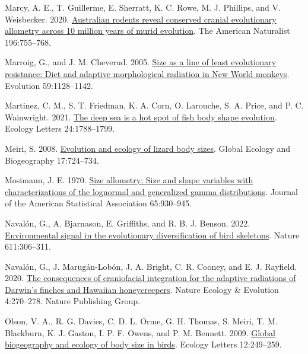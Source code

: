 \documentclass[
  11pt,
]{article}
\newlength{\cslhangindent}
\newlength{\cslentryspacingunit} %
\newenvironment{CSLReferences}[2] %
 {%
  \setlength{\parindent}{0pt}
  \ifodd #1
  \let\oldpar\par
  \def\par{\hangindent=\cslhangindent\oldpar}
  \fi
  \setlength{\parskip}{#2\cslentryspacingunit}
 }%
 {}
\begin{document}
\begin{CSLReferences}{1}{0}
\leavevmode{}%
Marcy, A. E., T. Guillerme, E. Sherratt, K. C. Rowe, M. J. Phillips, and
V. Weisbecker. 2020. \href{https://doi.org/10.1086/711398}{Australian
rodents reveal conserved cranial evolutionary allometry across 10
million years of murid evolution}. The American Naturalist 196:755--768.

\leavevmode{}%
Marroig, G., and J. M. Cheverud. 2005.
\href{https://doi.org/10.1111/j.0014-3820.2005.tb01049.x}{Size as a line
of least evolutionary resistance: Diet and adaptive morphological
radiation in {N}ew {W}orld monkeys}. Evolution 59:1128--1142.

\leavevmode{}%
Martinez, C. M., S. T. Friedman, K. A. Corn, O. Larouche, S. A. Price,
and P. C. Wainwright. 2021. \href{https://doi.org/10.1111/ele.13785}{The
deep sea is a hot spot of fish body shape evolution}. Ecology Letters
24:1788--1799.

\leavevmode{}%
Meiri, S. 2008.
\href{https://doi.org/10.1111/j.1466-8238.2008.00414.x}{Evolution and
ecology of lizard body sizes}. Global Ecology and Biogeography
17:724--734.

\leavevmode{}%
Mosimann, J. E. 1970.
\href{https://doi.org/10.1080/01621459.1970.10481136}{Size allometry:
Size and shape variables with characterizations of the lognormal and
generalized gamma distributions}. Journal of the American Statistical
Association 65:930--945.

\leavevmode{}%
Navalón, G., A. Bjarnason, E. Griffiths, and R. B. J. Benson. 2022.
\href{https://doi.org/10.1038/s41586-022-05372-y}{{Environmental signal
in the evolutionary diversification of bird skeletons}}. Nature
611:306--311.

\leavevmode{}%
Navalón, G., J. Marugán-Lobón, J. A. Bright, C. R. Cooney, and E. J.
Rayfield. 2020. \href{https://doi.org/10.1038/s41559-019-1092-y}{The
consequences of craniofacial integration for the adaptive radiations of
{D}arwin's finches and {H}awaiian honeycreepers}. Nature Ecology \&
Evolution 4:270--278. Nature Publishing Group.

\leavevmode{}%
Olson, V. A., R. G. Davies, C. D. L. Orme, G. H. Thomas, S. Meiri, T. M.
Blackburn, K. J. Gaston, I. P. F. Owens, and P. M. Bennett. 2009.
\href{https://doi.org/10.1111/j.1461-0248.2009.01281.x}{Global
biogeography and ecology of body size in birds}. Ecology Letters
12:249--259.


\end{CSLReferences}
\end{document}
